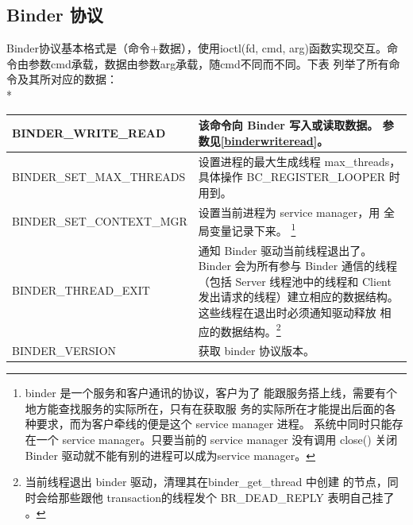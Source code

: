 \documentclass[a4paper,11pt]{article}
\begin{document}
\subsection{Binder 协议}\label{protocol}
Binder协议基本格式是（命令+数据），使用ioctl(fd, cmd,
arg)函数实现交互。命令由参数cmd承载，数据由参数arg承载，随cmd不同而不同。下表
列举了所有命令及其所对应的数据：\\*
\begin{minipage}{\textwidth}
\begin{tabular}{|p{}|p{}|}\hline
    BINDER_WRITE_READ & 该命令向 Binder 写入或读取数据。
    参数见\ref{binderwriteread}。\\\hline
    BINDER_SET_MAX_THREADS & 设置进程的最大生成线程 max_threads，具体操作
        BC_REGISTER_LOOPER 时用到。\\\hline
    BINDER_SET_CONTEXT_MGR & 设置当前进程为 service manager，用
        全局变量记录下来。 \footnote{binder 是一个服务和客户通讯的协议，客户为了
        能跟服务搭上线，需要有个地方能查找服务的实际所在，只有在获取服
        务的实际所在才能提出后面的各种要求，而为客户牵线的便是这个
        service manager 进程。
        系统中同时只能存在一个 service manager。只要当前的 service manager
        没有调用 close() 关闭 Binder 驱动就不能有别的进程可以成为service manager。}
        \\\hline
    BINDER_THREAD_EXIT & 通知 Binder 驱动当前线程退出了。 Binder 会为所有参与
    Binder 通信的线程（包括 Server 线程池中的线程和
    Client发出请求的线程）建立相应的数据结构。这些线程在退出时必须通知驱动释放
    相应的数据结构。\footnote{当前线程退出 binder 驱动，清理其在binder_get_thread 中创建
    的节点，同时会给那些跟他 transaction的线程发个 BR_DEAD_REPLY 表明自己挂了
    。}\\\hline

    BINDER_VERSION & 获取 binder 协议版本。\\\hline

\end{tabular}
\end{minipage}

\end{document}

